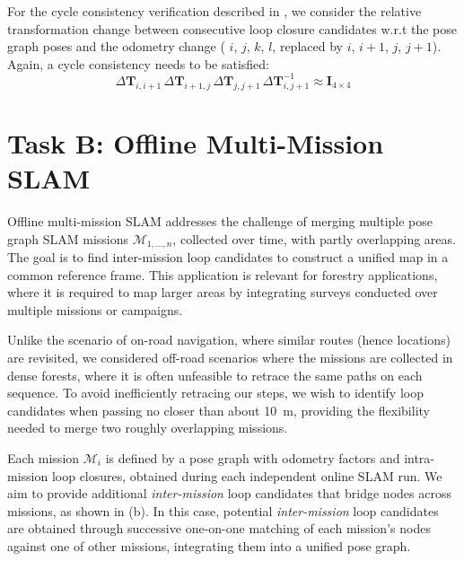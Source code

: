 For the cycle consistency verification described in , we consider the relative transformation change between consecutive loop closure candidates w.r.t the pose graph poses and the odometry change (  $i$, $j$, $k$, $l$, replaced by ${i}$, ${i+1}$, ${j}$, ${j+1}$). Again, a cycle consistency needs to be satisfied:
\begin{equation}
  \label{eq:cycle-online}
  \Delta\mathbf{T}_{i,i+1}\, \Delta\mathbf{T}_{i+1, j}\, \Delta\mathbf{T}_{j, j+1}\, \Delta\mathbf{T}_{i, j+1}^{-1} \approx \mathbf{I}_{4\times4}
\end{equation}


\section{Task B: Offline Multi-Mission SLAM}\label{sec:offline}
Offline multi-mission SLAM addresses the challenge of merging multiple pose graph SLAM missions ${\mathcal{M}_{1, \ldots, n}}$, collected over time, with partly overlapping areas. 
The goal is to find inter-mission loop candidates to construct a unified map in a common reference frame. This application is relevant for forestry applications, where it is required to map larger areas by integrating surveys conducted over multiple missions or campaigns.

Unlike the scenario of on-road navigation, where similar routes (hence locations) are revisited, we considered off-road scenarios where the missions are collected in dense forests, where it is often unfeasible to retrace the same paths on each sequence. To avoid inefficiently retracing our steps, we wish to identify loop candidates when passing no closer than about \SI{10}{\meter}, providing the flexibility needed to merge two roughly overlapping missions.

Each mission ${\mathcal{M}_{i}}$ is defined by a pose graph with odometry factors and intra-mission loop closures, obtained during each independent online SLAM run. We aim to provide additional \emph{inter-mission} loop candidates that bridge nodes across missions, as shown in  (b). In this case, potential \emph{inter-mission} loop candidates are obtained through successive one-on-one matching of each mission's nodes against one of other missions, integrating them into a unified pose graph.

